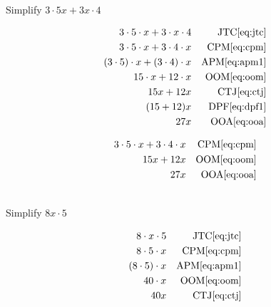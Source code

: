 \begin{example}[id:20141108-194156] \label{20141108-194156}  \hfill \\

Simplify $3 \cdot 5x + 3x \cdot 4$

\soln

\solnsteps
\begin{align*}
3 \cdot 5 \cdot x + 3 \cdot x \cdot 4 && \text{JTC} \eqref{eq:jtc} \\
3 \cdot 5 \cdot x + 3 \cdot 4 \cdot x && \text{CPM} \eqref{eq:cpm} \\
(3 \cdot 5) \cdot x + (3 \cdot 4) \cdot x && \text{APM} \eqref{eq:apm1} \\
15 \cdot x + 12 \cdot x && \text{OOM} \eqref{eq:oom} \\
15x +12x && \text{CTJ} \eqref{eq:ctj} \\
(15+12)x && \text{DPF} \eqref{eq:dpf1} \\
27x && \text{OOA} \eqref{eq:ooa} 
\end{align*}

\soln

\lesssteps
\begin{align*}
3 \cdot 5 \cdot x + 3 \cdot 4 \cdot x && \text{CPM} \eqref{eq:cpm} \\
15x + 12x && \text{OOM} \eqref{eq:oom} \\
27x && \text{OOA} \eqref{eq:ooa}  
\end{align*}

\end{example}

\begin{example}[id:20141108-173613] \label{20141108-173613}  \hfill \\

Simplify $8x \cdot 5$

\soln

\solnsteps
\begin{align*}
8 \cdot x \cdot 5 && \text{JTC} \eqref{eq:jtc} \\
8 \cdot 5 \cdot x && \text{CPM} \eqref{eq:cpm} \\
(8 \cdot 5) \cdot x && \text{APM} \eqref{eq:apm1} \\
40 \cdot x && \text{OOM} \eqref{eq:oom} \\
40x && \text{CTJ} \eqref{eq:ctj} 
\end{align*}
\end{example}

